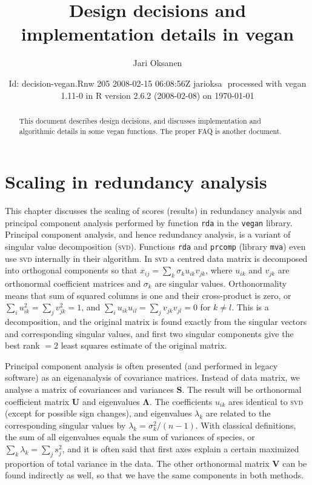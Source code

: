 \documentclass[a4paper,10pt]{amsart}
\author{Jari Oksanen}
\title{Design decisions and implementation details in vegan}
\date{$ $Id: decision-vegan.Rnw 205 2008-02-15 06:08:56Z jarioksa $ $
  processed with vegan
1.11-0
in R version 2.6.2 (2008-02-08) on \today}
\begin{document}

\maketitle

\begin{abstract}

\noindent This document describes design decisions, and discusses implementation
and algorithmic details in some vegan functions. The proper FAQ is
another document.

\end{abstract}

\tableofcontents

\section{Scaling in redundancy analysis}

This chapter discusses the scaling of scores (results) in redundancy
analysis and principal component analysis performed by function
\texttt{rda} in the \texttt{vegan} library.  Principal component
analysis, and hence redundancy analysis, is a variant of singular
value decomposition (\textsc{svd}).  Functions \texttt{rda} and
\texttt{prcomp} (library \texttt{mva}) even use \textsc{svd}
internally in their algorithm.  In \textsc{svd} a centred data matrix
is decomposed into orthogonal components so that $x_{ij} = \sum_k
\sigma_k u_{ik} v_{jk}$, where $u_{ik}$ and $v_{jk}$ are orthonormal
coefficient matrices and $\sigma_k$ are singular values.
Orthonormality means that sum of squared columns is one and their
cross-product is zero, or $\sum_i u_{ik}^2 = \sum_j v_{jk}^2 = 1$, and
$\sum_i u_{ik} u_{il} = \sum_j v_{jk} v_{jl} = 0$ for $k \neq l$. This
is a decomposition, and the original matrix is found exactly from the
singular vectors and corresponding singular values, and first two
singular components give the best rank $=2$ least squares estimate of
the original matrix.

Principal component analysis is often presented (and performed in
legacy software) as an eigenanalysis of covariance matrices.  Instead
of data matrix, we analyse a matrix of covariances and variances
$\mathbf{S}$.  The result will be orthonormal coefficient matrix
$\mathbf{U}$ and eigenvalues $\mathbf{\Lambda}$.  The coefficients
$u_{ik}$ ares identical to \textsc{svd} (except for possible sign
changes), and eigenvalues $\lambda_k$ are related to the corresponding
singular values by $\lambda_k = \sigma_k^2 /(n-1)$.  With classical
definitions, the sum of all eigenvalues equals the sum of variances of
species, or $\sum_k \lambda_k = \sum_j s_j^2$, and it is often said
that first axes explain a certain maximized proportion of total
variance in the data.  The other orthonormal matrix $\mathbf{V}$ can
be found indirectly as well, so that we have the same components in
both methods.
\end{document}
